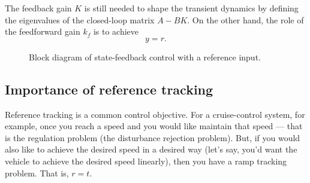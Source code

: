 \documentclass{ee122_notes}
\begin{document}
The feedback gain \(K\) is still needed to shape the transient dynamics by defining the eigenvalues of the closed-loop matrix \(A-BK\). On the other hand, the role of the feedforward gain \(k_f\) is to achieve
\[
y = r.
\]
\begin{figure}[t]
\centering

\caption{Block diagram of state-feedback control with a reference input.}
\label{fig:state-feedback-tracking}
\end{figure}



\subsection{Importance of reference tracking}
Reference tracking is a common control objective. For a cruise-control system, for example, once you reach a speed and you would like maintain that speed --- that is the regulation problem (the disturbance rejection problem). But, if you would also like to achieve the desired speed in a desired way (let's say, you'd want the vehicle to achieve the desired speed linearly), then you have a ramp tracking problem. That is, $r = t$.     
\end{document}
